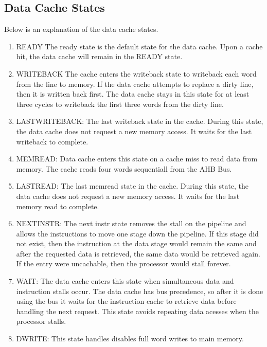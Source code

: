 \subsection{Data Cache States}
\label{sec:dstate}

Below is an explanation of the data cache states.

\begin{enumerate}
	\item READY 
	The ready state is the default state for the data cache.
	Upon a cache hit, the data cache will remain in the READY state.

	\item WRITEBACK
	The cache enters the writeback state to writeback each word from the line to memory.
	If the data cache attempts to replace a dirty line, then it is written back first.
	The data cache stays in this state for at least three cycles to writeback the first three words from the dirty line.

	\item LASTWRITEBACK:
	The last writeback state in the cache. 
	During this state, the data cache does not request a new memory access.
	It waits for the last writeback to complete.

	\item MEMREAD:
	Data cache enters this state on a cache miss to read data from memory.
	The cache reads four words sequentiall from the AHB Bus.

	\item LASTREAD:
	The last memread state in the cache. 
	During this state, the data cache does not request a new memory access.
	It waits for the last memory read to complete.

	\item NEXTINSTR:
	The next instr state removes the stall on the pipeline and allows the instructions to move one stage down the pipeline. If this stage did not exist, then the instruction at the data stage would remain the same and after the requested data is retrieved, the same data would be retrieved again. If the entry were uncachable, then the processor would stall forever.

	\item WAIT:
	The data cache enters this state when simultaneous data and instruction stalls occur. 
	The data cache has bus precedence, so after it is done using the bus it waits for the instruction cache to retrieve data before handling the next request. 
	This state avoids repeating data acesses when the processor stalls.

	\item DWRITE:
	This state handles disables full word writes to main memory.
	
\end{enumerate}
